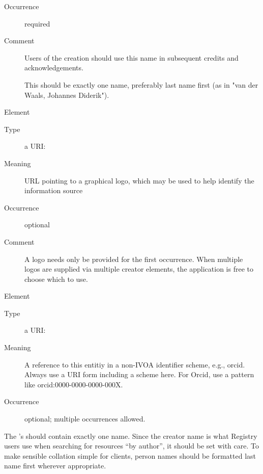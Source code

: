 \documentclass[11pt,a4paper]{ivoa}
\begin{document}
\begin{generated}
\begin{bigdescription}
\begin{description}
\item[Occurrence] required
\item[Comment] 
                  Users of the creation should use this name in
                  subsequent credits and acknowledgements.

                  This should be exactly one name, preferably last name
                  first (as in {"}van der Waals, Johannes Diderik{"}).
              

\end{description}
\item[Element \xmlel{logo}]
\begin{description}
\item[Type] a URI: 
\item[Meaning] 
                URL pointing to a graphical logo, which may be used to help 
                identify the information source
              
\item[Occurrence] optional
\item[Comment] 
                A logo needs only be provided for the first occurrence.
                When multiple logos are supplied via multiple creator 
                elements, the application is free to choose which to
                use. 
              

\end{description}
\item[Element \xmlel{altIdentifier}]
\begin{description}
\item[Type] a URI: 
\item[Meaning] 
                 A reference to this entitiy in a non-IVOA identifier
                 scheme, e.g., orcid.  Always use a URI form including
                 a scheme here.  For Orcid, use a pattern like
                 orcid:0000-0000-0000-000X.
              
\item[Occurrence] optional; multiple occurrences allowed.

\end{description}


\end{bigdescription}\endgroup

\endgroup
\end{generated}


The 's  should contain exactly one name.
Since the creator name is what Registry users use when searching for
resources ``by author'', it should be set with care.  To make sensible
collation simple for clients, person names should be formatted last name
first wherever appropriate.
\end{document}

